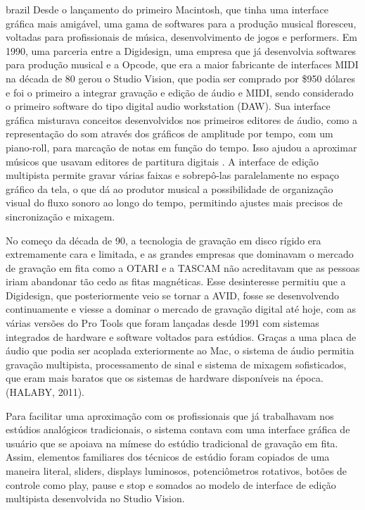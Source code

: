 \begin{otherlanguage*}{brazil}
Desde o lançamento do primeiro Macintosh, que tinha uma interface gráfica mais amigável, uma gama de softwares para a produção musical floresceu, voltadas para profissionais de música, desenvolvimento de jogos e performers. Em 1990, uma parceria entre a Digidesign, uma empresa que já desenvolvia softwares para produção musical e a Opcode, que era a maior fabricante de interfaces MIDI na década de 80 gerou o Studio Vision, que podia ser comprado por \$950 dólares e foi o primeiro a integrar gravação e edição de áudio e MIDI, sendo considerado o primeiro software do tipo digital audio workstation (DAW). Sua interface gráfica misturava conceitos desenvolvidos nos primeiros editores de áudio, como a representação do som através dos gráficos de amplitude por tempo, com um piano-roll, para marcação de notas em função do tempo. Isso ajudou a aproximar músicos que usavam editores de partitura digitais \cite{ChrisHalaby2011}. A interface de edição multipista permite gravar várias faixas e sobrepô-las paralelamente no espaço gráfico da tela, o que dá ao produtor musical a possibilidade de organização visual do fluxo sonoro ao longo do tempo, permitindo ajustes mais precisos de sincronização e mixagem.

No começo da década de 90, a tecnologia de gravação em disco rígido era extremamente cara e limitada, e as grandes empresas que dominavam o mercado de gravação em fita como a OTARI e a TASCAM não acreditavam que as pessoas iriam abandonar tão cedo as fitas magnéticas. Esse desinteresse permitiu que a Digidesign, que posteriormente veio se tornar a AVID, fosse se desenvolvendo continuamente e viesse a dominar o mercado de gravação digital até hoje, com as várias versões do Pro Tools que foram lançadas desde 1991 com sistemas integrados de hardware e software voltados para estúdios. Graças a uma placa de áudio que podia ser acoplada exteriormente ao Mac, o sistema de áudio permitia gravação multipista, processamento de sinal e sistema de mixagem sofisticados, que eram mais baratos que os sistemas de hardware disponíveis na época. (HALABY, 2011).

Para facilitar uma aproximação com os profissionais que já trabalhavam nos estúdios analógicos tradicionais, o sistema contava com uma interface gráfica de usuário que se apoiava na mímese do estúdio tradicional de gravação em fita. Assim, elementos familiares dos técnicos de estúdio foram copiados de uma maneira literal, sliders, displays luminosos, potenciômetros rotativos, botões de controle como play, pause e stop e somados ao modelo de interface de edição multipista desenvolvida no Studio Vision. 


\end{otherlanguage*}
